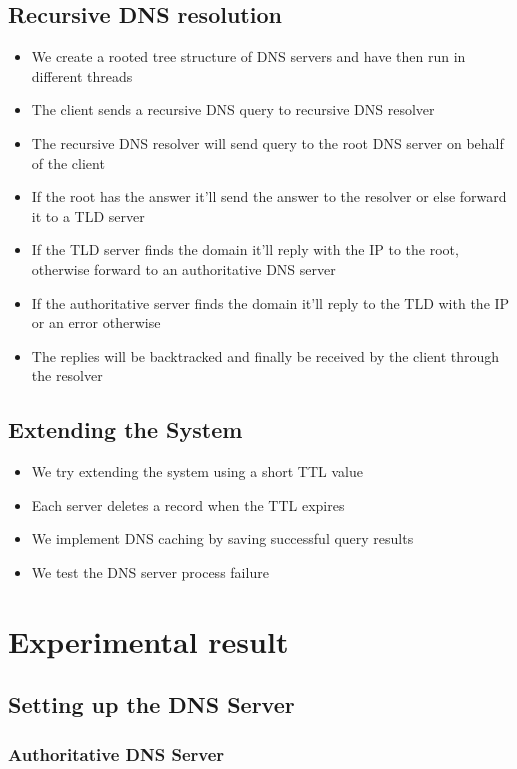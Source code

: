 \documentclass[11pt]{article}
\begin{document}
    \subsection{Recursive DNS resolution}
        \begin{itemize}
            \item We create a rooted tree structure of DNS servers and have then run in different threads
            \item The client sends a recursive DNS query to recursive DNS resolver
            \item The recursive DNS resolver will send query to the root DNS server on behalf of the client
            \item If the root has the answer it'll send the answer to the resolver or else forward it to a TLD server
            \item If the TLD server finds the domain it'll reply with the IP to the root, otherwise forward to an authoritative DNS server
            \item If the authoritative server finds the domain it'll reply to the TLD with the IP or an error otherwise
            \item The replies will be backtracked and finally be received by the client through the resolver
        \end{itemize}
    \subsection{Extending the System}
        \begin{itemize}
            \item We try extending the system using a short TTL value
            \item Each server deletes a record when the TTL expires
            \item We implement DNS caching by saving successful query results
            \item We test the DNS server process failure
        \end{itemize}

\section{Experimental result}
    \subsection{Setting up the DNS Server}
        \subsubsection*{Authoritative DNS Server}
\end{document}
